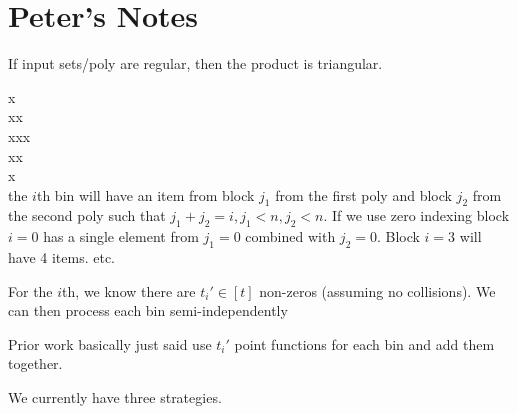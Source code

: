 \section{Peter's Notes}

If input sets/poly are regular, then the product is triangular.

\noindent
x \\
xx\\
xxx\\
xx\\
x\\

the $i$th bin will have an item from block $j_1$ from the first poly and block $j_2$ from the second poly such that $j_1+j_2=i, j_1<n,j_2<n$. If we use zero indexing block $i=0$ has a single element from $j_1=0$ combined with $j_2=0$. Block $i=3$ will have 4 items. etc. 

For the $i$th, we know there are $t_i'\in[t]$ non-zeros (assuming no collisions). We can then process each bin semi-independently

Prior work basically just said use $t_i'$ point functions for each bin and add them together.

We currently have three strategies.

